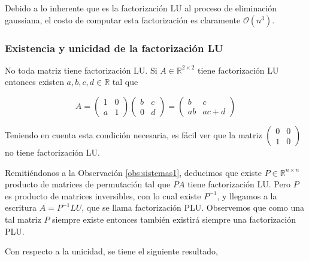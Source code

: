 


Debido a lo inherente que es la factorización LU al proceso de eliminación gaussiana, el costo de computar esta factorización es claramente $\mathcal{O}(n^3)$.

\subsubsection{Existencia y unicidad de la factorización LU}

\begin{obs}
No toda matriz tiene factorización LU. Si $A \in \mathbb{R}^{2 \times 2}$ tiene factorización LU entonces existen $a, b, c, d \in \mathbb{R}$ tal que

\[A = \begin{pmatrix}1 & 0\\a & 1\end{pmatrix} \begin{pmatrix}b & c\\0 & d\end{pmatrix} = \begin{pmatrix}
b & c\\ab & ac + d
\end{pmatrix}\]

Teniendo en cuenta esta condición necesaria, es fácil ver que la matriz $\begin{pmatrix}
0 & 0\\1 & 0
\end{pmatrix}$ no tiene factorización LU.

\end{obs}

\begin{obs}
Remitiéndonos a la Observación \ref{obs:sistemas1}, deducimos que existe $P \in \mathbb{R}^{n \times n}$ producto de matrices de permutación tal que $PA$ tiene factorización LU. Pero $P$ es producto de matrices inversibles, con lo cual existe $P^{-1}$, y llegamos a la escritura $A = P^{-1}LU$, que se llama factorización PLU. Observemos que como una tal matriz $P$ siempre existe entonces también existirá siempre una factorización PLU.
\end{obs}

Con respecto a la unicidad, se tiene el siguiente resultado,

